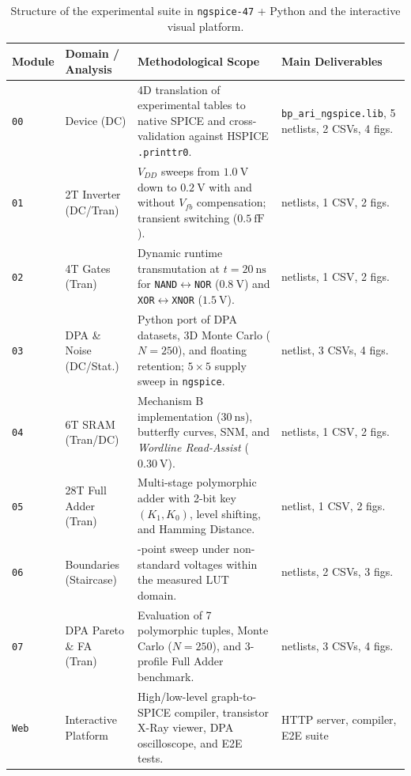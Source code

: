 \begin{table}[htbp]
\centering
\caption{Structure of the experimental suite in \texttt{ngspice-47} + Python and the interactive visual platform.}
\label{tab:module_summary}
\scriptsize
\begin{tabularx}{\textwidth}{>{\raggedright\arraybackslash}p{1.05cm} >{\raggedright\arraybackslash}p{2.35cm} >{\raggedright\arraybackslash}X >{\raggedright\arraybackslash}p{3.45cm}}
\toprule
\textbf{Module} & \textbf{Domain / Analysis} & \textbf{Methodological Scope} & \textbf{Main Deliverables} \\
\midrule
\texttt{00} & Device (DC) & 4D translation of experimental tables to native SPICE and cross-validation against HSPICE \texttt{.printtr0}. & \texttt{bp\_\allowbreak ari\_\allowbreak ngspice.lib}, 5 netlists, 2 CSVs, 4 figs. \\
\texttt{01} & 2T Inverter (DC/Tran) & $V_{DD}$ sweeps from $1.0\ \text{V}$ down to $0.2\ \text{V}$ with and without $V_{fb}$ compensation; transient switching ($0.5\ \text{fF}$). & 2 netlists, 1 CSV, 2 figs. \\
\texttt{02} & 4T Gates (Tran) & Dynamic runtime transmutation at $t=20\ \text{ns}$ for \texttt{NAND}$\leftrightarrow$\texttt{NOR} ($0.8\ \text{V}$) and \texttt{XOR}$\leftrightarrow$\texttt{XNOR} ($1.5\ \text{V}$). & 2 netlists, 1 CSV, 2 figs. \\
\texttt{03} & DPA \& Noise (DC/Stat.) & Python port of DPA datasets, 3D Monte Carlo ($N=250$), and floating retention; $5\times 5$ supply sweep in \texttt{ngspice}. & 1 netlist, 3 CSVs, 4 figs. \\
\texttt{04} & 6T SRAM (Tran/DC) & Mechanism B implementation ($30\ \text{ns}$), butterfly curves, SNM, and \textit{Wordline Read-Assist} ($0.30\ \text{V}$). & 2 netlists, 1 CSV, 2 figs. \\
\texttt{05} & 28T Full Adder (Tran) & Multi-stage polymorphic adder with 2-bit key $(K_1, K_0)$, level shifting, and Hamming Distance. & 1 netlist, 1 CSV, 2 figs. \\
\texttt{06} & Boundaries (Staircase) & 292-point sweep under non-standard voltages within the measured LUT domain. & 3 netlists, 2 CSVs, 3 figs. \\
\texttt{07} & DPA Pareto \& FA (Tran) & Evaluation of 7 polymorphic tuples, Monte Carlo ($N=250$), and 3-profile Full Adder benchmark. & 4 netlists, 3 CSVs, 4 figs. \\
\texttt{Web} & Interactive Platform & High/low-level graph-to-SPICE compiler, transistor X-Ray viewer, DPA oscilloscope, and E2E tests. & HTTP server, compiler, E2E suite \\
\bottomrule
\end{tabularx}
\end{table}

